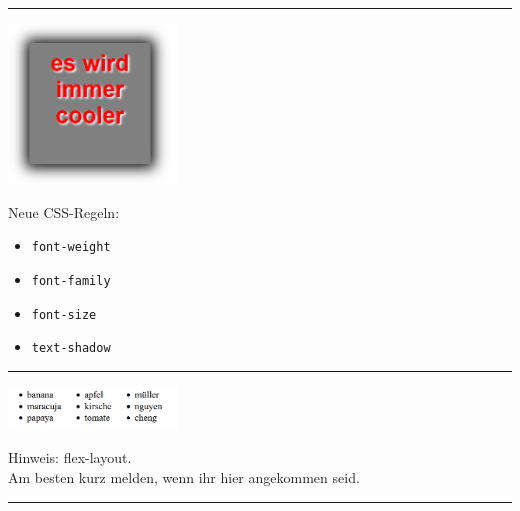 \documentclass[11pt]{article}
\begin{document}
    \vspace{0.5cm}
    \hrule
    \vspace{0.5cm}

    \begin{minipage}{0.4\textwidth}
        \includegraphics[width=4.5cm]{css9} \\
    \end{minipage}
    \hspace{0.1\textwidth}
    \begin{minipage}{0.4\textwidth}
        Neue CSS-Regeln:
        \begin{itemize}
            \item \Verb"font-weight"
            \item \Verb"font-family"
            \item \Verb"font-size"
            \item \Verb"text-shadow"
        \end{itemize}
    \end{minipage}

    \vspace{0.5cm}
    \hrule
    \vspace{0.5cm}

    \begin{minipage}{0.4\textwidth}
        \includegraphics[width=4.5cm]{css8} \\
    \end{minipage}
    \hspace{0.1\textwidth}
    \begin{minipage}{0.4\textwidth}
        Hinweis: flex-layout. \\
        Am besten kurz melden, wenn ihr hier angekommen seid.
    \end{minipage}

    \vspace{0.5cm}
    \hrule
    \vspace{0.5cm}
\end{document}
